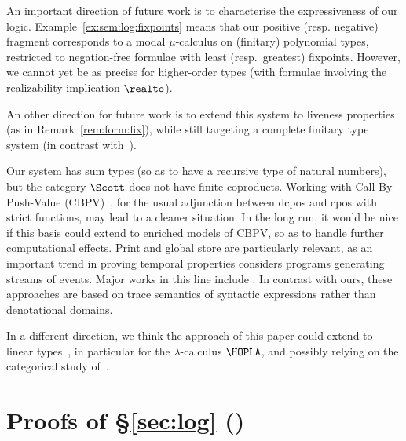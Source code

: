 An important direction of future work is to characterise
the expressiveness of our logic.
%
Example~\ref{ex:sem:log:fixpoints} means that our positive
(resp. negative) fragment corresponds to a 
modal $\mu$-calculus on (finitary) polynomial types,
restricted to negation-free formulae with least (resp.\ greatest) fixpoints.
%
However, we cannot yet be as precise for higher-order types
(with formulae involving the realizability implication $\realto$). 

An other direction for future work is to extend this system
to liveness properties (as in Remark~\ref{rem:form:fix}),
while still targeting a complete finitary type system
(in contrast with~\cite{jr21esop,rk25wollic}).


Our system has sum types (so as to have a recursive type of natural numbers),
but the category $\Scott$ does not have finite coproducts.
Working with Call-By-Push-Value (CBPV)~\cite{levy03book,levy22siglog},
for the usual adjunction between dcpos and cpos with strict functions,
may lead to a cleaner situation.
In the long run, it would be nice if this basis could extend to
enriched models of CBPV,
so as to handle further computational effects.
Print and global store are particularly relevant,
as an important trend in proving temporal properties
considers programs generating streams of events.
Major works in this line include
\cite{ssv08jfp,hc14lics,hl17lics,nukt18lics,kt14lics,ust17popl,nukt18lics,%
su23popl}.
In contrast with ours, these approaches are based on trace semantics
of syntactic expressions rather than denotational domains.



In a different direction, we think the approach of this paper
could extend to linear types~\cite{hjk00mscs,nw03concur,winskel04llcs},
in particular for the $\lambda$-calculus $\HOPLA$,
and possibly relying on the categorical study of~\cite{bf06book}.



\appendix
\section{Proofs of \S\ref{sec:log} ()}
\label{sec:proof:log}


